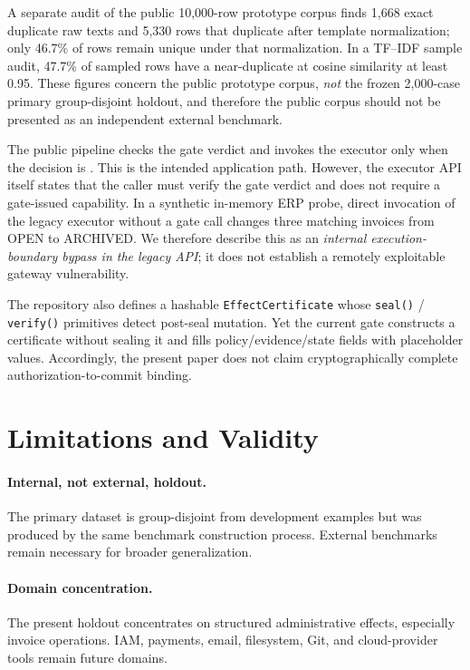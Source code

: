 A separate audit of the public 10,000-row prototype corpus finds 1,668 exact duplicate raw texts and 5,330 rows that duplicate after template normalization; only 46.7\% of rows remain unique under that normalization. In a TF--IDF sample audit, 47.7\% of sampled rows have a near-duplicate at cosine similarity at least 0.95. These figures concern the public prototype corpus, \emph{not} the frozen 2,000-case primary group-disjoint holdout, and therefore the public corpus should not be presented as an independent external benchmark.

The public pipeline checks the gate verdict and invokes the executor only when the decision is \allow. This is the intended application path. However, the executor API itself states that the caller must verify the gate verdict and does not require a gate-issued capability. In a synthetic in-memory ERP probe, direct invocation of the legacy executor without a gate call changes three matching invoices from OPEN to ARCHIVED. We therefore describe this as an \emph{internal execution-boundary bypass in the legacy API}; it does not establish a remotely exploitable gateway vulnerability.

The repository also defines a hashable \texttt{EffectCertificate} whose \texttt{seal()} / \texttt{verify()} primitives detect post-seal mutation. Yet the current gate constructs a certificate without sealing it and fills policy/evidence/state fields with placeholder values. Accordingly, the present paper does not claim cryptographically complete authorization-to-commit binding.

\section{Limitations and Validity}

\paragraph{Internal, not external, holdout.}
The primary dataset is group-disjoint from development examples but was produced by the same benchmark construction process. External benchmarks remain necessary for broader generalization.

\paragraph{Domain concentration.}
The present holdout concentrates on structured administrative effects, especially invoice operations. IAM, payments, email, filesystem, Git, and cloud-provider tools remain future domains.


